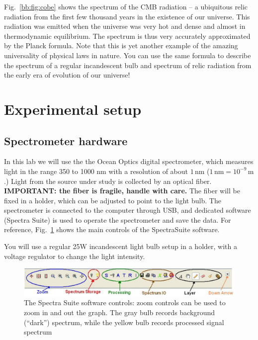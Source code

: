 Fig.~\ref{bb:fig:cobe} shows the spectrum of the CMB radiation -- a ubiquitous relic radiation from the first few thousand years in the existence of our universe. This radiation was emitted when the universe was very hot and dense and almost in thermodynamic equilibrium. The spectrum is thus very accurately approximated by the Planck formula. %
Note that this is yet another example of the amazing universality of physical laws in nature. You can use the same formula to describe the spectrum of a regular incandescent bulb and spectrum of relic radiation from the early era of evolution of our universe!

\section{Experimental setup}
\subsection{Spectrometer hardware}

In this lab we will use the the Ocean Optics digital spectrometer, which measures light in the range 350 to 1000 nm with a resolution of about $1\,$nm  ($1\,\textrm{nm} = 10^{-9}\,\textrm{m}$.) Light from the source under study is collected by an optical fiber. \textbf{IMPORTANT: the fiber is fragile, handle with care.} The fiber will be fixed in a holder, which can be adjusted to point to the light bulb. The spectrometer is connected to the computer through USB, and dedicated software (Spectra Suite) is used to operate the spectrometer and save the data. For reference, Fig.~\ref{bb:fig:software1} shows the main controls of the SpectraSuite software.

You will use a regular 25W incandescent light bulb setup in a holder, with a voltage regulator to change the light intensity.

\begin{figure}
	\begin{center}
		\includegraphics[angle=0,width=1.0\textwidth]{blackbody/software1.jpg}
		\caption{The Spectra Suite software controls: zoom controls can be used to zoom in and
			out the graph. The gray bulb records background (“dark”) spectrum, while the yellow bulb records processed signal spectrum}\label{bb:fig:software1}
	\end{center}
\end{figure}

